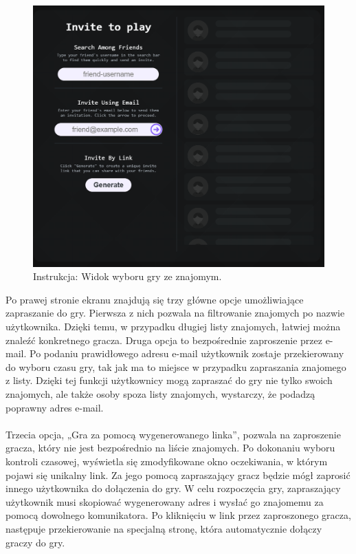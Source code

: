 \documentclass[twoside]{projektInzynierskiMS1}
\begin{document}
\vspace{0.5cm}
\begin{figure}[h!]
    \centering
    \includegraphics[width=1\textwidth]{images/ins_min_pvf.png}
    \caption{Instrukcja: Widok wyboru gry ze znajomym.}
\end{figure}

\newpage

\noindent
Po prawej stronie ekranu znajdują się trzy główne opcje umożliwiające zapraszanie do gry. Pierwsza z nich pozwala na filtrowanie znajomych po nazwie użytkownika. Dzięki temu, w przypadku długiej listy znajomych, łatwiej można znaleźć konkretnego gracza. Druga opcja to bezpośrednie zaproszenie przez e-mail. Po podaniu prawidłowego adresu e-mail użytkownik zostaje przekierowany do wyboru czasu gry, tak jak ma to miejsce w przypadku zapraszania znajomego z listy. Dzięki tej funkcji użytkownicy mogą zapraszać do gry nie tylko swoich znajomych, ale także osoby spoza listy znajomych, wystarczy, że podadzą poprawny adres e-mail.
\\\\
Trzecia opcja, „Gra za pomocą wygenerowanego linka”, pozwala na zaproszenie gracza, który nie jest bezpośrednio na liście znajomych. Po dokonaniu wyboru kontroli czasowej, wyświetla się zmodyfikowane okno oczekiwania, w którym pojawi się unikalny link. Za jego pomocą zapraszający gracz będzie mógł zaprosić innego użytkownika do dołączenia do gry. W celu rozpoczęcia gry, zapraszający użytkownik musi skopiować wygenerowany adres i wysłać go znajomemu za pomocą dowolnego komunikatora. Po kliknięciu w link przez zaproszonego gracza, następuje przekierowanie na specjalną stronę, która automatycznie dołączy graczy do gry.
\end{document}
